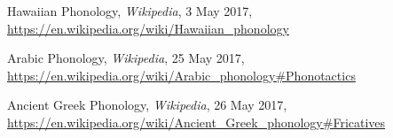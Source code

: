 \documentclass[11pt,letterpaper]{article}
\begin{document}
\pagebreak
\begin{thebibliography}{99}
	 Hawaiian Phonology, \textit{Wikipedia}, 3 May 2017,
    \url{https://en.wikipedia.org/wiki/Hawaiian_phonology}
    
     Arabic Phonology, \textit{Wikipedia}, 25 May 2017,
    \url{https://en.wikipedia.org/wiki/Arabic_phonology#Phonotactics}
    
     Ancient Greek Phonology, \textit{Wikipedia}, 26 May 2017,
    \url{https://en.wikipedia.org/wiki/Ancient_Greek_phonology#Fricatives}
\end{thebibliography}
\end{document}
